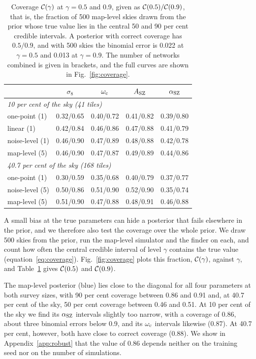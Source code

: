 \begin{table}
\centering
\caption{Coverage $\mathcal{C}(\gamma)$ at $\gamma = 0.5$ and 0.9, given as $\mathcal{C}(0.5)/\mathcal{C}(0.9)$, that is, the
fraction of 500 map-level skies drawn from the prior whose true value lies in the central 50 and 90 per
cent credible intervals. A posterior with correct coverage has $0.5/0.9$, and with 500 skies the binomial
error is 0.022 at $\gamma=0.5$ and 0.013 at $\gamma=0.9$. The number of networks combined is given in
brackets, and the full curves are shown in Fig.~\ref{fig:coverage}.}
\label{tab:coverage}
\small
\setlength{\tabcolsep}{3.5pt}
\begin{tabular}{lcccc}
\toprule
 & $\sigma_8$ & $\omega_\mathrm{c}$ & $A_\mathrm{SZ}$ & $\alpha_\mathrm{SZ}$ \\
\midrule
\multicolumn{5}{l}{\emph{10 per cent of the sky (41 tiles)}}\\
one-point (1)    & 0.32/0.65 & 0.40/0.72 & 0.41/0.82 & 0.39/0.80 \\
linear (1)       & 0.42/0.84 & 0.46/0.86 & 0.47/0.88 & 0.41/0.79 \\
noise-level (1)  & 0.46/0.90 & 0.47/0.89 & 0.48/0.88 & 0.42/0.78 \\
map-level (5)    & 0.46/0.90 & 0.47/0.87 & 0.49/0.89 & 0.44/0.86 \\
\midrule
\multicolumn{5}{l}{\emph{40.7 per cent of the sky (168 tiles)}}\\
one-point (1)    & 0.30/0.59 & 0.35/0.68 & 0.40/0.79 & 0.37/0.77 \\
noise-level (5)  & 0.50/0.86 & 0.51/0.90 & 0.52/0.90 & 0.35/0.74 \\
map-level (5)    & 0.51/0.90 & 0.47/0.88 & 0.48/0.91 & 0.46/0.88 \\
\bottomrule
\end{tabular}
\end{table}

A small bias at the true parameters can hide a posterior that fails elsewhere in the prior, and we
therefore also test the coverage over the whole prior. We draw 500 skies from the prior, run the map-level
simulator and the finder on each, and count how often the central credible interval of level $\gamma$
contains the true value (equation~\ref{eq:coverage}). Fig.~\ref{fig:coverage} plots this fraction,
$\mathcal{C}(\gamma)$, against $\gamma$, and Table~\ref{tab:coverage} gives $\mathcal{C}(0.5)$ and $\mathcal{C}(0.9)$.

The map-level posterior (blue) lies close to the diagonal for all four parameters at both survey sizes,
with 90 per cent coverage between 0.86 and 0.91 and, at 40.7 per cent of the sky, 50 per cent coverage
between 0.46 and 0.51. At 10 per cent of the sky we find its $\alpha_\mathrm{SZ}$ intervals slightly too narrow, with
a coverage of 0.86, about three binomial errors below 0.9, and its $\omega_\mathrm{c}$ intervals likewise (0.87). At
40.7 per cent, however, both have close to correct coverage (0.88). We show in
Appendix~\ref{app:robust} that the value of 0.86 depends neither on the training seed nor on the number of
simulations.

